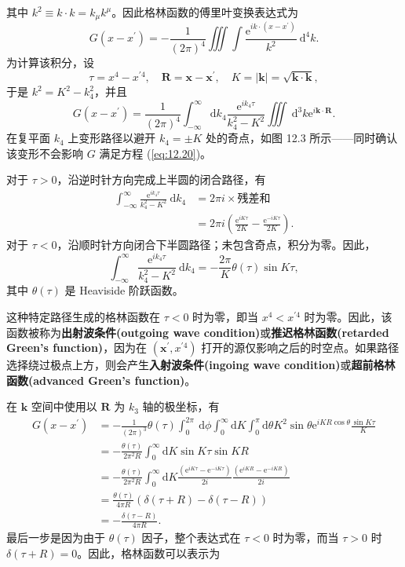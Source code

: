 其中
$k^{2} \equiv k \cdot k = k_{\mu} k^{\mu}$。因此格林函数的傅里叶变换表达式为
\begin{equation}\label{eq:12.21} 
 G\left(x-x^{\prime}\right)=-\frac{1}{(2 \pi)^{4}} \iiint \int \frac{\mathrm{e}^{i k \cdot\left(x-x^{\prime}\right)}}{k^{2}} \mathrm{~d}^{4} k. 
 \end{equation}
为计算该积分，设
 $$
\tau=x^{4}-x^{\prime 4}, \quad \mathbf{R}=\mathbf{x}-\mathbf{x}^{\prime}, \quad K=|\mathbf{k}|=\sqrt{\mathbf{k} \cdot \mathbf{k}},
$$
于是 $k^{2}=K^{2}-k_{4}^{2}$，并且
 $$
G\left(x-x^{\prime}\right)=\frac{1}{(2 \pi)^{4}} \int_{-\infty}^{\infty} \mathrm{d} k_{4} \frac{\mathrm{e}^{i k_{4} \tau}}{k_{4}^{2}-K^{2}} \iiint \mathrm{~d}^{3} k \mathrm{e}^{i \mathbf{k} \cdot \mathbf{R}}.
$$
在复平面 $k_{4}$ 上变形路径以避开 $k_{4}=\pm K$ 处的奇点，如图 12.3
所示------同时确认该变形不会影响 $G$ 满足方程 (\ref{eq:12.20})。

对于 $\tau>0$，沿逆时针方向完成上半圆的闭合路径，有
 $$
\begin{aligned}
\int_{-\infty}^{\infty} \frac{\mathrm{e}^{i k_{4} \tau}}{k_{4}^{2}-K^{2}} \mathrm{~d} k_{4} & =2 \pi i \times \text{残差和} \\
& =2 \pi i\left(\frac{\mathrm{e}^{i K \tau}}{2 K}-\frac{\mathrm{e}^{-i K \tau}}{2 K}\right).
\end{aligned}
$$
对于
$\tau<0$，沿顺时针方向闭合下半圆路径；未包含奇点，积分为零。因此，
 $$
\int_{-\infty}^{\infty} \frac{\mathrm{e}^{i k_{4} \tau}}{k_{4}^{2}-K^{2}} \mathrm{~d} k_{4}=-\frac{2 \pi}{K} \theta(\tau) \sin K \tau,
$$
其中 $\theta(\tau)$ 是 Heaviside 阶跃函数。

这种特定路径生成的格林函数在 $\tau<0$ 时为零，即当
$x^{4}<x^{\prime 4}$
时为零。因此，该函数被称为\textbf{出射波条件(outgoing wave condition)}或\textbf{推迟格林函数(retarded Green's function)}，因为在
$\left(\mathbf{x}^{\prime}, x^{\prime 4}\right)$
打开的源仅影响之后的时空点。如果路径选择绕过极点上方，则会产生\textbf{入射波条件(ingoing wave condition)}或\textbf{超前格林函数(advanced Green's
function)}。

在 $\mathbf{k}$ 空间中使用以 $\mathbf{R}$ 为 $k_{3}$
轴的极坐标，有
 $$
\begin{aligned}
G\left(x-x^{\prime}\right) & =-\frac{1}{(2 \pi)^{3}} \theta(\tau) \int_{0}^{2 \pi} \mathrm{~d} \phi \int_{0}^{\infty} \mathrm{d} K \int_{0}^{\pi} \mathrm{d} \theta K^{2} \sin \theta \mathrm{e}^{i K R \cos \theta} \frac{\sin K \tau}{K} \\
& =-\frac{\theta(\tau)}{2 \pi^{2} R} \int_{0}^{\infty} \mathrm{d} K \sin K \tau \sin K R \\
& =-\frac{\theta(\tau)}{2 \pi^{2} R} \int_{0}^{\infty} \mathrm{d} K \frac{\left(\mathrm{e}^{i K \tau}-\mathrm{e}^{-i K \tau}\right)}{2 i} \frac{\left(\mathrm{e}^{i K R}-\mathrm{e}^{-i K R}\right)}{2 i} \\
& =\frac{\theta(\tau)}{4 \pi R}(\delta(\tau+R)-\delta(\tau-R)) \\
& =-\frac{\delta(\tau-R)}{4 \pi R}.
\end{aligned}
$$
最后一步是因为由于 $\theta(\tau)$ 因子，整个表达式在 $\tau<0$
时为零，而当 $\tau>0$ 时
$\delta(\tau+R)=0$。因此，格林函数可以表示为

